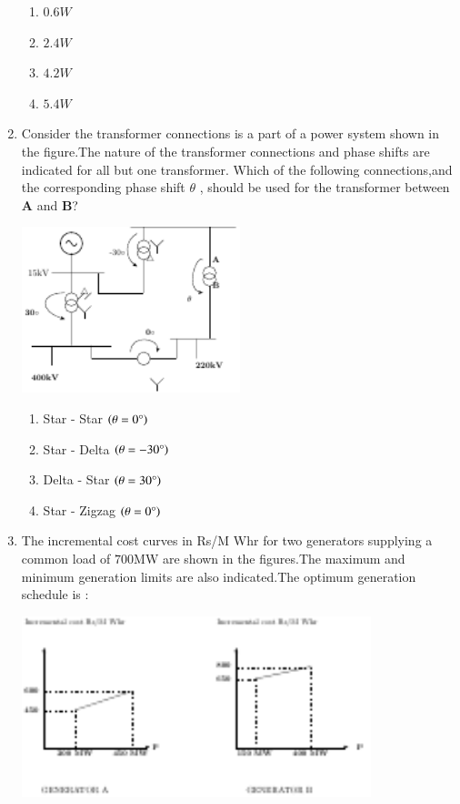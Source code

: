 \documentclass[journal,12pt,onecolumn]{IEEEtran}
\theoremstyle{remark}
\begin{document}
\begin{enumerate}
    \begin{enumerate}
        \item $0.6 W$
        \item $2.4 W$
        \item $4.2 W$
        \item $5.4 W$\\
    \end{enumerate}
    \item Consider the transformer connections is a part of a power system shown in the figure.The nature of the transformer connections and phase shifts are indicated for all but one transformer.
    Which of the following connections,and the corresponding phase shift $\theta$ , should be used for the transformer between $\mathbf{A}$ and $\mathbf{B}$?
		 \begin{center}

\includegraphics[width=0.5\textwidth]{figs/fig3/main} 
\end{center}

    \begin{enumerate}
        \item Star - Star $\left(\theta = 0\degree\right)$
        \item Star - Delta $\left(\theta = -30\degree\right)$
        \item Delta - Star $\left(\theta = 30\degree\right)$
        \item Star - Zigzag $\left(\theta = 0\degree\right)$\\
    \end{enumerate}
    \item The incremental cost curves in Rs/M Whr for two generators supplying a common load of $700$MW are shown in the figures.The maximum and minimum generation limits are also indicated.The optimum generation schedule is $\colon$
	     \begin{center}

\includegraphics[width=0.8\textwidth]{figs/fig4/main} 
\end{center}


\end{enumerate}
\end{document}
